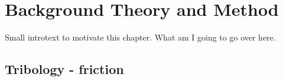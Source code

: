 \newpage
\chapter{Background Theory and Method}

Small introtext to motivate this chapter. What am I going to go over here.


\section{Tribology - friction}












